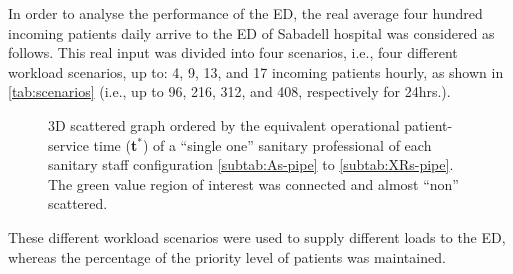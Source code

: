 \documentclass[11pt]{article} %
\begin{document}
In order to analyse the performance of the ED, the real average four
hundred incoming patients daily arrive to the ED of Sabadell hospital
was considered as follows. This real input was divided into four scenarios,
i.e., four different workload scenarios, up to: 4, 9, 13, and 17 incoming
patients hourly, as shown in \ref{tab:scenarios} (i.e., up to 96,
216, 312, and 408, respectively for 24hrs.).
\begin{figure}[H]
\noindent \begin{centering}
\par\end{centering}

\caption{3D scattered graph ordered by the equivalent operational patient-service
time ({\bf t$^*$}) of a ``single one'' sanitary
professional of each sanitary staff configuration \ref{subtab:As-pipe}
to \ref{subtab:XRs-pipe}. The green value region of interest was
connected and almost ``non'' scattered.\label{fig:3D-scattered-LoS-tpipe} }
\end{figure}
 These different workload scenarios were used to supply different
loads to the ED, whereas the percentage of the priority level of patients
was maintained. 

\begin{table}[H]
\centering{}\caption{Incoming ED patients divided into four different workload scenarios,
up to: 4, 9, 13, and 17 patients per hour for each scenario. \label{tab:scenarios}}
\end{table}
\clearpage{}
\end{document}
